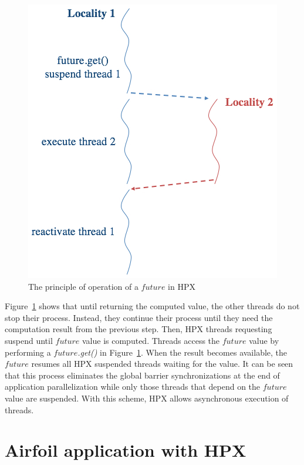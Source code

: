 \documentclass[conference]{IEEEtran}
\begin{document}
\begin{figure} [!h]
\begin{center}
\centering
\includegraphics[width=0.75\columnwidth]{Pictures/f4a.jpg}
\caption {The principle of operation of a \textit{$future$} in HPX}
\label{f4}
\end{center}
\end{figure}



Figure~\ref{f4} shows that until returning the computed value, the other threads do not stop their process. Instead, they continue their process until they need the computation result from the previous step. Then, HPX threads requesting suspend until $future$ value is computed. Threads access the $future$ value by performing a \textit{$future$.get()} in Figure~\ref{f4}. When the result becomes available, the \textit{$future$} resumes all HPX suspended threads waiting for the value. It can be seen that this process eliminates the global barrier synchronizations at the end of application parallelization while only those threads that depend on the $future$ value are suspended. With this scheme, HPX allows asynchronous execution of threads.


\section{Airfoil application with HPX}
\label{sec:air}
\end{document}
